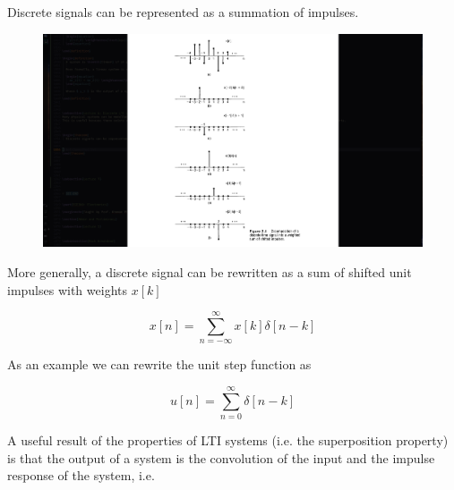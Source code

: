 \documentclass[../notes.tex]{subfiles}
\begin{document}
\begin{theorem}
	Discrete signals can be represented as a summation of impulses.

	\begin{figure}[H]
		\centering
		\includegraphics[width=\linewidth]{img/image_2022-09-22-13-51-38.png}
	\end{figure}

	More generally, a discrete signal can be rewritten as a sum of shifted unit impulses with weights $ x[k] $  

	\begin{equation}
		x[n] = \sum_{n=-\infty}^{\infty} x[k] \delta [n-k]
	\end{equation}

	\begin{example}
		As an example we can rewrite the unit step function as

		\begin{equation}
			u[n] = \sum_{n=0}^{\infty} \delta[n-k]
		\end{equation}
		
	\end{example}

\end{theorem}

A useful result of the properties of LTI systems (i.e. the superposition property) is that the output of a system is the convolution of the input and the impulse response of the system, i.e.
\end{document}
